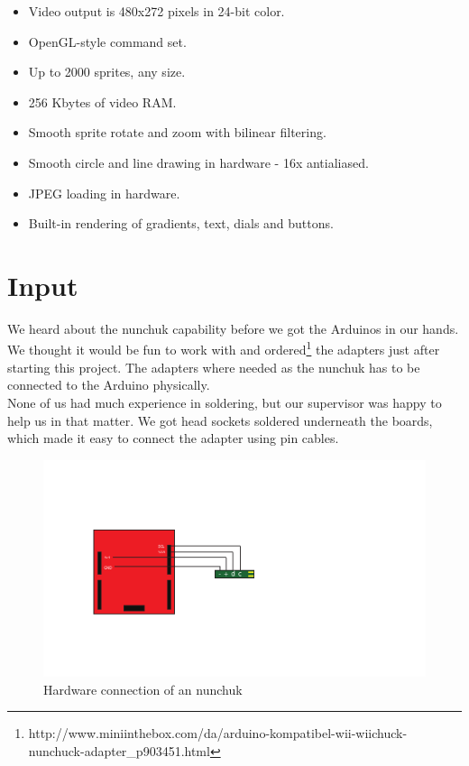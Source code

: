 \begin{multicols}{2}
\begin{itemize}
  \footnotesize
    \item Video output is 480x272 pixels in 24-bit color.
    \item OpenGL-style command set.
    \item Up to 2000 sprites, any size.
    \item 256 Kbytes of video RAM.
    \item Smooth sprite rotate and zoom with bilinear filtering.
    \item Smooth circle and line drawing in hardware - 16x antialiased.
    \item JPEG loading in hardware.
    \item Built-in rendering of gradients, text, dials and buttons.
  \end{itemize}
\end{multicols}

\section{Input}%
We heard about the nunchuk capability before we got the Arduinos in our
hands. We thought it would be fun to work with and ordered\footnote{http://www.miniinthebox.com/da/arduino-kompatibel-wii-wiichuck-nunchuck-adapter\_p903451.html} the adapters just after starting this project. The adapters where needed as the nunchuk has to be connected to the Arduino physically.
\\
None of us had much experience in soldering, but our supervisor was happy
to help us in that matter. We got head sockets soldered underneath
the boards, which made it easy to connect the adapter using pin cables.

\begin{figure}
  \begin{center}
     \includegraphics[scale=0.7]{Figures/NunchuckConnection}
  \end{center}
  \caption{Hardware connection of an nunchuk}
  \label{fig:nunchuk_connect}
\end{figure}




